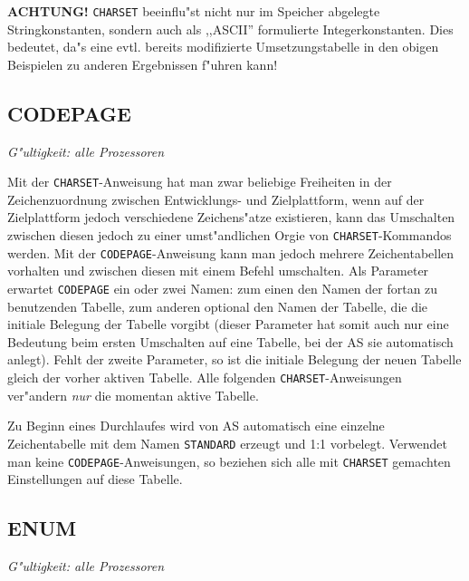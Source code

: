 \documentclass[12pt,a4paper,twoside]{report}
\makeatletter
\newcommand{\bb}[1]{{\bf #1}}
\newcommand{\tty}[1]{{\tt #1}}
\newcommand{\ttindex}[1]{\index{#1@{\tt #1}}}
\makeatother
\begin{document}
\bb{ACHTUNG!} \tty{CHARSET} beeinflu"st nicht nur im Speicher abgelegte
Stringkonstanten, sondern auch als ,,ASCII'' formulierte Integerkonstanten.
Dies bedeutet, da"s eine evtl. bereits modifizierte Umsetzungstabelle
in den obigen Beispielen zu anderen Ergebnissen f"uhren kann!


\subsection{CODEPAGE}
\ttindex{CODEPAGE}

{\em G"ultigkeit: alle Prozessoren}

Mit der \tty{CHARSET}-Anweisung hat man zwar beliebige Freiheiten in der
Zeichenzuordnung zwischen Entwicklungs- und Zielplattform, wenn auf der
Zielplattform jedoch verschiedene Zeichens"atze existieren, kann das 
Umschalten zwischen diesen jedoch zu einer umst"andlichen Orgie von
\tty{CHARSET}-Kommandos werden.  Mit der \tty{CODEPAGE}-Anweisung kann
man jedoch mehrere Zeichentabellen vorhalten und zwischen diesen mit einem
Befehl umschalten.  Als Parameter erwartet \tty{CODEPAGE} ein oder zwei
Namen: zum einen den Namen der fortan zu benutzenden Tabelle, zum anderen
optional den Namen der Tabelle, die die initiale Belegung der Tabelle
vorgibt (dieser Parameter hat somit auch nur eine Bedeutung beim ersten
Umschalten auf eine Tabelle, bei der AS sie automatisch anlegt).  Fehlt
der zweite Parameter, so ist die initiale Belegung der neuen Tabelle
gleich der vorher aktiven Tabelle.  Alle folgenden
\tty{CHARSET}-Anweisungen ver"andern {\em nur} die momentan aktive Tabelle.

Zu Beginn eines Durchlaufes wird von AS automatisch eine einzelne
Zeichentabelle mit dem Namen \tty{STANDARD} erzeugt und 1:1 vorbelegt. 
Verwendet man keine \tty{CODEPAGE}-Anweisungen, so beziehen sich alle mit
\tty{CHARSET} gemachten Einstellungen auf diese Tabelle.


\subsection{ENUM}
\ttindex{ENUM}

{\em G"ultigkeit: alle Prozessoren}
\end{document}
